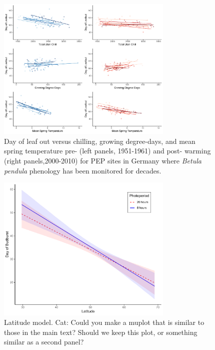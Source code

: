 \documentclass{article}
\begin{document}
\newpage
\begin{figure}[h!]
\centering
\noindent \includegraphics[width=0.75\textwidth]{..//..//analyses/bb_analysis/PEP_climate/figures/betpen_multruns_utahgddmat.pdf}
\caption{Day of leaf out versus chilling, growing degree-days, and mean spring temperature pre- (left panels, 1951-1961) and post- warming (right panels,2000-2010) for PEP sites in Germany where \emph{Betula pendula} phenology has been monitored for decades.}
\label{fig:pep}
\end{figure}

\newpage
\begin{figure}[h!]
\centering
\noindent \includegraphics[width=0.75\textwidth]{..//..//analyses/lat_analysis/figures/LatxPhoto_allspp.pdf}
\caption{Latitude model. Cat: Could you make a muplot that is similar to those in the main text? Should we keep this plot, or something similar as a second panel?}
\label{fig:lat}
\end{figure}
\end{document}
